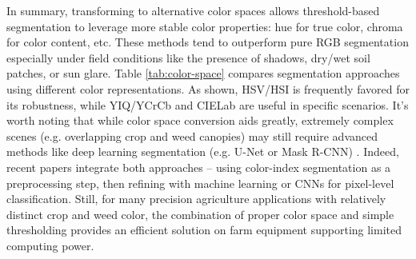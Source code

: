 \documentclass[letterpaper]{report}
\begin{document}
%
In summary, transforming to alternative color spaces allows threshold-based segmentation to leverage more stable color properties: hue for true color, chroma for color content, etc. These methods tend to outperform pure RGB segmentation especially under field conditions like the presence of shadows, dry/wet soil patches, or sun glare. Table \ref{tab:color-space} compares segmentation approaches using different color representations. As shown, HSV/HSI is frequently favored for its robustness, while YIQ/YCrCb and CIELab are useful in specific scenarios. It’s worth noting that while color space conversion aids greatly, extremely complex scenes (e.g. overlapping crop and weed canopies) may still require advanced methods like deep learning segmentation (e.g. U-Net or Mask R-CNN) \parencite{Wu2021-gt}. Indeed, recent papers integrate both approaches – using color-index segmentation as a preprocessing step, then refining with machine learning or CNNs for pixel-level classification. Still, for many precision agriculture applications with relatively distinct crop and weed color, the combination of proper color space and simple thresholding provides an efficient solution on farm equipment supporting limited computing power.
%
\end{document}
